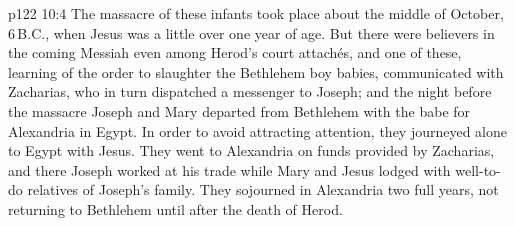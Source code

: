 \vs p122 10:4 The massacre of these infants took place about the middle of October, 6\,B.C., when Jesus was a little over one year of age. But there were believers in the coming Messiah even among Herod’s court attachés, and one of these, learning of the order to slaughter the Bethlehem boy babies, communicated with Zacharias, who in turn dispatched a messenger to Joseph; and the night before the massacre Joseph and Mary departed from Bethlehem with the babe for Alexandria in Egypt. In order to avoid attracting attention, they journeyed alone to Egypt with Jesus. They went to Alexandria on funds provided by Zacharias, and there Joseph worked at his trade while Mary and Jesus lodged with well\hyp{}to\hyp{}do relatives of Joseph’s family. They sojourned in Alexandria two full years, not returning to Bethlehem until after the death of Herod.
